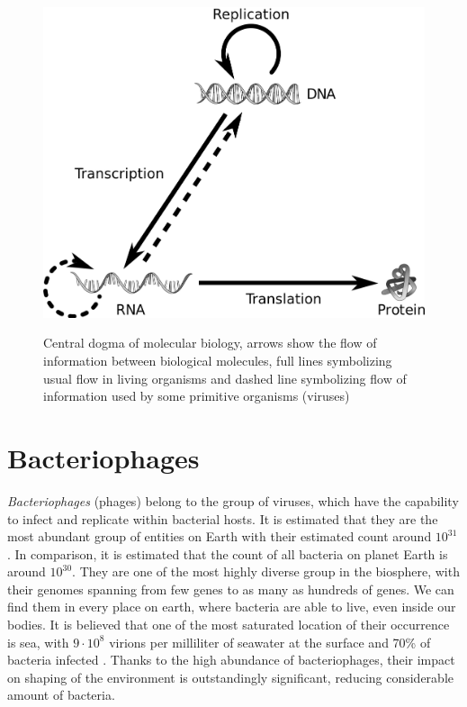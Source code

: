 \begin{figure}[htp]
\includegraphics[width=\linewidth]{./images/central_dogma.png}
\centering
\cite{central_dogma}
\caption{Central dogma of molecular biology,
arrows show the flow of information between biological molecules, full lines symbolizing usual flow in living organisms and dashed line symbolizing flow of information used by some primitive organisms (viruses)}
\end{figure}

\section{Bacteriophages}
\emph{Bacteriophages} (phages) belong to the group of viruses, which have the capability to infect and replicate within bacterial hosts.
It is estimated that they are the most abundant group of entities on Earth with their estimated count around $10^{31}$\cite{phage}.
In comparison, it is estimated that the count of all bacteria on planet Earth is around $10^{30}$.
They are one of the most highly diverse group in the biosphere, with their genomes spanning from few genes to as many as hundreds of genes.
We can find them in every place on earth, where bacteria are able to live, even inside our bodies.
It is believed that one of the most saturated location of their occurrence is sea, with  $9\cdot 10^8$ virions per milliliter of seawater at the surface and 70\% of bacteria infected \cite{virioplankton}.
Thanks to the high abundance of bacteriophages, their impact on shaping of the environment is outstandingly significant, reducing considerable amount of bacteria.

